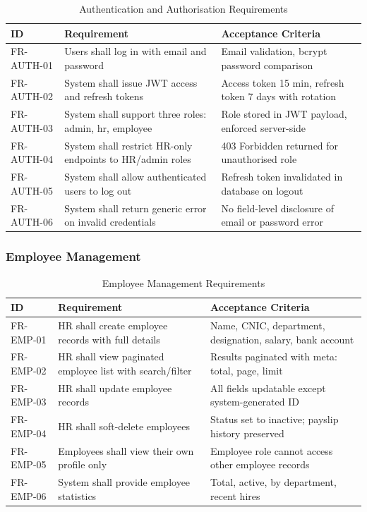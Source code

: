 \documentclass[12pt,a4paper]{report}
\begin{document}
\begin{table}[H]
\centering
\caption{Authentication and Authorisation Requirements}
\label{tab:auth_req}
\begin{tabular}{|p{2.2cm}|p{5cm}|p{5cm}|}
\hline
\textbf{ID} & \textbf{Requirement} & \textbf{Acceptance Criteria} \\
\hline
FR-AUTH-01 & Users shall log in with email and password & Email validation, bcrypt password comparison \\
\hline
FR-AUTH-02 & System shall issue JWT access and refresh tokens & Access token 15 min, refresh token 7 days with rotation \\
\hline
FR-AUTH-03 & System shall support three roles: admin, hr, employee & Role stored in JWT payload, enforced server-side \\
\hline
FR-AUTH-04 & System shall restrict HR-only endpoints to HR/admin roles & 403 Forbidden returned for unauthorised role \\
\hline
FR-AUTH-05 & System shall allow authenticated users to log out & Refresh token invalidated in database on logout \\
\hline
FR-AUTH-06 & System shall return generic error on invalid credentials & No field-level disclosure of email or password error \\
\hline
\end{tabular}
\end{table}

\subsubsection{Employee Management}

\begin{table}[H]
\centering
\caption{Employee Management Requirements}
\label{tab:emp_req}
\begin{tabular}{|p{2.2cm}|p{5cm}|p{5cm}|}
\hline
\textbf{ID} & \textbf{Requirement} & \textbf{Acceptance Criteria} \\
\hline
FR-EMP-01 & HR shall create employee records with full details & Name, CNIC, department, designation, salary, bank account \\
\hline
FR-EMP-02 & HR shall view paginated employee list with search/filter & Results paginated with meta: total, page, limit \\
\hline
FR-EMP-03 & HR shall update employee records & All fields updatable except system-generated ID \\
\hline
FR-EMP-04 & HR shall soft-delete employees & Status set to inactive; payslip history preserved \\
\hline
FR-EMP-05 & Employees shall view their own profile only & Employee role cannot access other employee records \\
\hline
FR-EMP-06 & System shall provide employee statistics & Total, active, by department, recent hires \\
\hline
\end{tabular}
\end{table}
\end{document}
